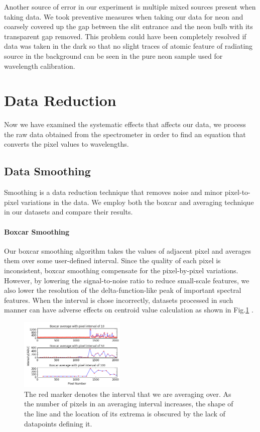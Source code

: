 \documentclass[authoryear,12pt,5p,times]{elsarticle}
\begin{document}
Another source of error in our experiment is multiple mixed sources present when taking data. We took preventive measures when taking our data for neon and coarsely covered up the gap between the slit entrance and the neon bulb with its transparent gap removed. This problem could have been completely resolved if data was taken in the dark so that no slight traces of atomic feature of radiating source in the background can be seen in the pure neon sample used for wavelength calibration.
\section{Data Reduction}
 Now we have examined the systematic effects that affects our data, we process the raw data obtained from the spectrometer in order to find an equation that converts the pixel values to wavelengths.
  \subsection{Data Smoothing}
  Smoothing is a data reduction technique that removes noise and minor pixel-to-pixel variations in the data. We employ both the boxcar and averaging technique in our datasets and compare their results.
  \paragraph*{\textbf{Boxcar Smoothing}}
  Our boxcar smoothing algorithm takes the values of adjacent pixel and averages them over some user-defined interval. Since the quality of each pixel is inconsistent, boxcar smoothing compensate for the pixel-by-pixel variations.  However, by lowering the signal-to-noise ratio to reduce small-scale features, we also lower the resolution of the delta-function-like peak of important spectral features. When the interval is chose incorrectly, datasets processed in such manner can have adverse effects on centroid value calculation as shown in Fig.\ref{boxcar} .
 \begin{figure}[h!] 
\includegraphics[width=0.45\textwidth]{figures/boxcar}
\caption{The red marker denotes the interval that we are averaging over. As the number of pixels in an averaging interval increases, the shape of the line and the location of its extrema is obscured by the lack of datapoints defining it.}\label{boxcar}
\end{figure}
\end{document}
